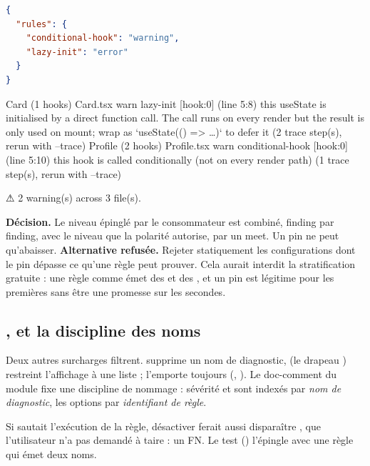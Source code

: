 \begin{lstlisting}[language=JSON]
{
  "rules": {
    "conditional-hook": "warning",
    "lazy-init": "error"
  }
}
\end{lstlisting}

\begin{sortie}
  Card  (1 hooks)  Card.tsx
    warn   lazy-init  [hook:0]  (line 5:8)  this useState is initialised by a direct function call. The call runs on every render but the result is only used on mount; wrap as `useState(() => …)` to defer it
       (2 trace step(s), rerun with --trace)
  Profile  (2 hooks)  Profile.tsx
    warn   conditional-hook  [hook:0]  (line 5:10)  this hook is called conditionally (not on every render path)
       (1 trace step(s), rerun with --trace)

⚠  2 warning(s) across 3 file(s).
\end{sortie}

\begin{decision}
\textbf{Décision.} Le niveau épinglé par le consommateur est combiné, finding par finding, avec le niveau que la polarité autorise, par un meet. Un pin ne peut qu'abaisser.
\textbf{Alternative refusée.} Rejeter statiquement les configurations dont le pin dépasse ce qu'une règle peut prouver. Cela aurait interdit la stratification gratuite : une règle comme  émet des \Error{} et des \Warning{}, et un pin  est légitime pour les premières sans être une promesse sur les secondes.
\end{decision}

\subsection{,  et la discipline des noms}

Deux autres surcharges filtrent.  supprime un nom de diagnostic,  (le drapeau ) restreint l'affichage à une liste ;  l'emporte toujours (, ). Le doc-comment du module fixe une discipline de nommage : sévérité et  sont indexés par \emph{nom de diagnostic}, les options par \emph{identifiant de règle}.


Si  sautait l'exécution de la règle, désactiver  ferait aussi disparaître , que l'utilisateur n'a pas demandé à taire : un FN. Le test  () l'épingle avec une règle qui émet deux noms.

